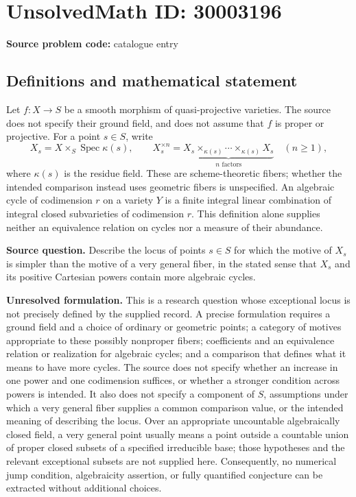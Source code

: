 \documentclass[11pt]{article}
\begin{document}
\section*{UnsolvedMath ID: 30003196}
\textbf{Source problem code:} catalogue entry
\subsection{Definitions and mathematical statement}
Let \(f\colon X\to S\) be a smooth morphism of quasi-projective varieties. The source does not specify their ground field, and does not assume that \(f\) is proper or projective. For a point \(s\in S\), write
\[
X_s=X\times_S\operatorname{Spec}\kappa(s),
\qquad
X_s^{\times n}=\underbrace{X_s\times_{\kappa(s)}\cdots\times_{\kappa(s)}X_s}_{n\text{ factors}}
\quad(n\geq 1),
\]
where \(\kappa(s)\) is the residue field. These are scheme-theoretic fibers; whether the intended comparison instead uses geometric fibers is unspecified. An algebraic cycle of codimension \(r\) on a variety \(Y\) is a finite integral linear combination of integral closed subvarieties of codimension \(r\). This definition alone supplies neither an equivalence relation on cycles nor a measure of their abundance.

\textbf{Source question.} Describe the locus of points \(s\in S\) for which the motive of \(X_s\) is simpler than the motive of a very general fiber, in the stated sense that \(X_s\) and its positive Cartesian powers contain more algebraic cycles.

\textbf{Unresolved formulation.} This is a research question whose exceptional locus is not precisely defined by the supplied record. A precise formulation requires a ground field and a choice of ordinary or geometric points; a category of motives appropriate to these possibly nonproper fibers; coefficients and an equivalence relation or realization for algebraic cycles; and a comparison that defines what it means to have more cycles. The source does not specify whether an increase in one power and one codimension suffices, or whether a stronger condition across powers is intended. It also does not specify a component of \(S\), assumptions under which a very general fiber supplies a common comparison value, or the intended meaning of describing the locus. Over an appropriate uncountable algebraically closed field, a very general point usually means a point outside a countable union of proper closed subsets of a specified irreducible base; those hypotheses and the relevant exceptional subsets are not supplied here. Consequently, no numerical jump condition, algebraicity assertion, or fully quantified conjecture can be extracted without additional choices.
\end{document}
